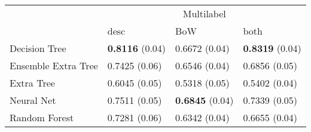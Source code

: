 \begin{tabular}{|l|l|l|l| }
\hline
 &  \multicolumn{3}{c|}{Multilabel} \\
\cline{2-4} & desc & BoW & both \\ \hline
Decision Tree       & {\bf 0.8116} (0.04) & 0.6672 (0.04) & {\bf 0.8319} (0.04)\\
Ensemble Extra Tree & 0.7425 (0.06) & 0.6546 (0.04) & 0.6856 (0.05)\\
Extra Tree          & 0.6045 (0.05) & 0.5318 (0.05) & 0.5402 (0.04)\\
Neural Net          & 0.7511 (0.05) & {\bf 0.6845} (0.04) & 0.7339 (0.05)\\
Random Forest       & 0.7281 (0.06) & 0.6342 (0.04) & 0.6655 (0.04)\\
\hline
\end{tabular}